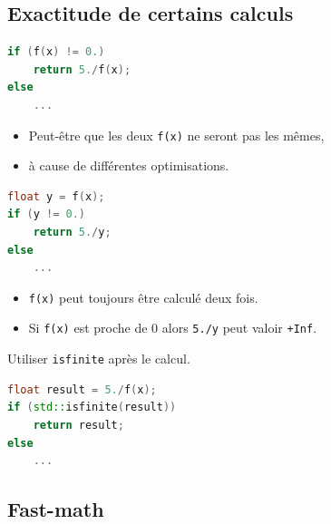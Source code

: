 \documentclass{beamer}
\begin{document}
\subsection{Exactitude de certains calculs}

\begin{frame}[fragile]
    \begin{lstlisting}[language=c++]
if (f(x) != 0.)
    return 5./f(x);
else
    ...
    \end{lstlisting}

    \begin{itemize}
        \item Peut-être que les deux \verb'f(x)' ne seront pas les mêmes,
        \item à cause de différentes optimisations.
    \end{itemize}
\end{frame}

\begin{frame}[fragile]
    \begin{lstlisting}[language=c++]
float y = f(x);
if (y != 0.)
    return 5./y;
else
    ...
    \end{lstlisting}

    \begin{itemize}
        \item \verb'f(x)' peut toujours être calculé deux fois.
        \item Si \verb'f(x)' est proche de $0$ alors \verb'5./y' peut valoir \verb'+Inf'.
    \end{itemize}
\end{frame}

\begin{frame}[fragile]
    Utiliser \verb'isfinite' après le calcul.

    \begin{lstlisting}[language=c++]
float result = 5./f(x);
if (std::isfinite(result))
    return result;
else
    ...
    \end{lstlisting}
\end{frame}

\subsection{Fast-math}

\begin{frame}
    \tableofcontents[currentsection]
\end{frame}
\end{document}
